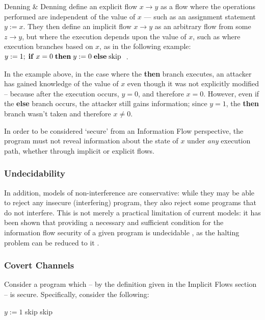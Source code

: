 Denning \& Denning \cite{denning1977if} define an explicit flow $ x \rightarrow y$ as a flow where the operations performed are independent of the value of $ x $ --- such as an assignment statement $ y := x $. They then define an implicit flow $ x \rightarrow y$ as an arbitrary flow from some $ z \rightarrow y $, but where the execution depends upon the value of $ x $, such as where execution branches based on $ x $, as in the following example: $ y := 1; \;\text{\textbf{if}}\; x = 0 \;\text{\textbf{then}}\; y := 0 \;\text{\textbf{else}}\; \text{skip}\;$ \cite{denning1977if}.

In the example above, in the case where the \textbf{then} branch executes, an attacker has gained knowledge of the value of $ x $ even though it was not explicitly modified -- because after the execution occurs, $ y = 0 $, and therefore $ x = 0 $. However, even if the \textbf{else} branch occurs, the attacker still gains information; since $ y = 1 $, the \textbf{then} branch wasn't taken and therefore $ x \ne 0 $.

In order to be considered `secure' from an Information Flow perspective, the program must not reveal information about the state of $ x $ under \textit{any} execution path, whether through implicit or explicit flows.

\subsubsection{Undecidability}



In addition, models of non-interference are conservative: while they may be able to reject any insecure (interfering) program, they also reject some programs that do not interfere. This is not merely a practical limitation of current models: it has been shown that providing a necessary and sufficient condition for the information flow security of a given program is undecidable \cite{landi1992undecidability}, as the halting problem can be reduced to it \cite{denning1977if}.

\subsubsection{Covert Channels}

Consider a program which -- by the definition given in the Implicit Flows section -- is secure. Specifically, consider the following: 

\begin{algorithmic}
	\State $ y := 1 $
			\State skip
		\EndFor
	\Else
		\State skip
	\EndIf
\end{algorithmic}

